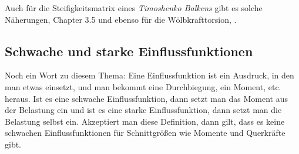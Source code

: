 Auch f\"{u}r die Steifigkeitsmatrix eines {\em Timoshenko Balkens\/} gibt es solche N\"{a}herungen, \cite{Ha5} Chapter 3.5 und ebenso f\"{u}r die W\"{o}lbkrafttorsion, \cite{Kindmann}.

\textcolor{sectionTitleBlue}{\subsection{Schwache und starke Einflussfunktionen}}
Noch ein Wort zu diesem Thema: Eine Einflussfunktion ist ein Ausdruck, in den man etwas einsetzt, und man bekommt eine Durchbiegung, ein Moment, etc. heraus. Ist es eine schwache Einflussfunktion, dann setzt man das Moment aus der Belastung ein und ist es eine starke Einflussfunktion, dann setzt man die Belastung selbst ein. Akzeptiert man diese Definition, dann  gilt, dass es keine schwachen Einflussfunktionen f\"{u}r Schnittgr\"{o}{\ss}en wie Momente und Querkr\"{a}fte gibt.

